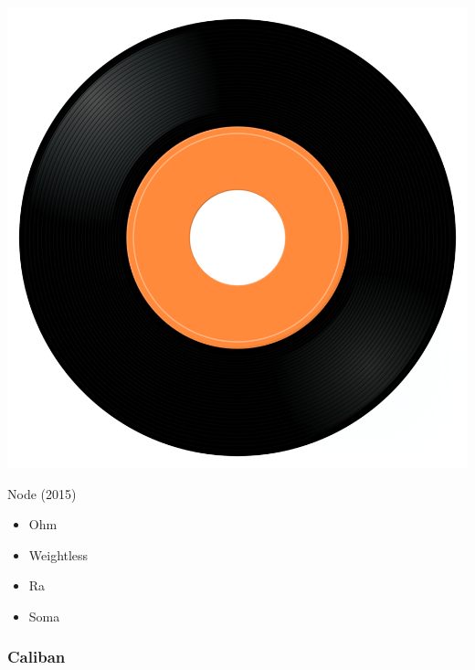\begin{minipage}[t]{0.25\textwidth}
\captionsetup{type=figure}
\includegraphics[width=\textwidth]{Images/cover.png}
\caption*{Node (2015)}
\end{minipage}
\begin{minipage}[t]{0.25\textwidth}\vspace{0pt}
\begin{itemize}[nosep,leftmargin=1em,labelwidth=*,align=left]
	\setlength{\itemsep}{0pt}
	\item Ohm
	\item Weightless
	\item Ra
	\item Soma
\end{itemize}
\end{minipage}

\subsubsection{Caliban}

